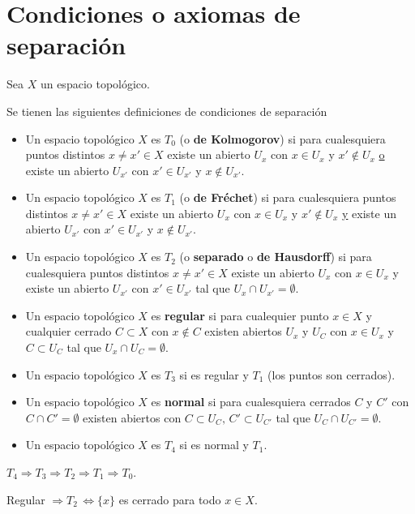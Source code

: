\section{Condiciones o axiomas de separaci\'on}
Sea $X$ un espacio topol\'ogico. 
\begin{defi} Se tienen las siguientes definiciones de condiciones de separaci\'on 
    \begin{itemize}
        \item Un espacio topol\'ogico $X$ es \textbf{$T_0$} (o \textbf{de Kolmogorov}) si para cualesquiera puntos distintos $x\neq x' \in X$ existe un abierto $U_x$ con $x\in U_x$ y $x'\nin U_x$ \underline{o} existe un abierto $U_{x'}$ con $x'\in U_{x'}$ y $x\nin U_{x'}$.
        \item Un espacio topol\'ogico $X$ es \textbf{$T_1$} (o \textbf{de Fréchet}) si para cualesquiera puntos distintos $x\neq x' \in X$ existe un abierto $U_x$ con $x\in U_x$ y $x'\nin U_x$ \underline{y} existe un abierto $U_{x'}$ con $x'\in U_{x'}$ y $x\nin U_{x'}$. 
        \item Un espacio topol\'ogico $X$ es \textbf{$T_2$} (o \textbf{separado} o \textbf{de Hausdorff}) si para cualesquiera puntos distintos $x\neq x' \in X$ existe un abierto $U_x$ con $x\in U_x$ y existe un abierto $U_{x'}$ con $x'\in U_{x'}$ tal que $U_x\cap U_{x'} = \emptyset$. 
        \item Un espacio topol\'ogico $X$ es \textbf{regular} si para cualequier punto $x \in X$ y cualquier cerrado $C\subset X$ con $x\nin C$ existen abiertos $U_x$ y $U_C$ con $x\in U_x$ y $C\subset U_C$ tal que $U_x\cap U_{C} = \emptyset$.
        \item Un espacio topol\'ogico $X$ es \textbf{$T_3$} si es regular y $T_1$ (los puntos son cerrados). 
        \item Un espacio topol\'ogico $X$ es \textbf{normal} si para cualesquiera cerrados $C$ y $C'$ con \\ $C\cap C'=\emptyset$ existen abiertos con $C \subset U_C, \, C'\subset U_{C'}$ tal que $U_C \cap U_{C'}=\emptyset$. 
        \item Un espacio topol\'ogico $X$ es \textbf{$T_4$} si es normal y $T_1$.  
    \end{itemize}
\end{defi}
\begin{obs}
    $T_4  \Rightarrow T_3 \Rightarrow T_2 \Rightarrow T_1 \Rightarrow T_0$.

    Regular $\Rightarrow T_2 \, \iff \{x\}$ es cerrado para todo $x\in X$. 
\end{obs}

